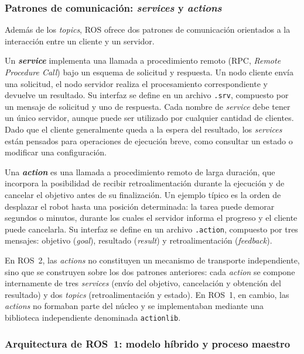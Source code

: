 \subsubsection{Patrones de comunicación: \textit{services} y \textit{actions}}

Además de los \textit{topics}, ROS ofrece dos patrones de comunicación
orientados a la interacción entre un cliente y un servidor.

Un \textbf{\textit{service}} implementa una llamada a procedimiento remoto
(RPC, \textit{Remote Procedure Call}) bajo un esquema de solicitud y
respuesta. Un nodo cliente envía una solicitud, el nodo servidor realiza el
procesamiento correspondiente y devuelve un resultado. Su interfaz se define en
un archivo \texttt{.srv}, compuesto por un mensaje de solicitud y uno de
respuesta. Cada nombre de \textit{service} debe tener un único servidor, aunque
puede ser utilizado por cualquier cantidad de clientes. Dado que el cliente
generalmente queda a la espera del resultado, los \textit{services} están
pensados para operaciones de ejecución breve, como consultar un estado o
modificar una configuración.

Una \textbf{\textit{action}} es una llamada a procedimiento remoto de larga
duración, que incorpora la posibilidad de recibir retroalimentación durante la
ejecución y de cancelar el objetivo antes de su finalización. Un ejemplo típico
es la orden de desplazar el robot hasta una posición determinada: la tarea
puede demorar segundos o minutos, durante los cuales el servidor informa el
progreso y el cliente puede cancelarla. Su interfaz se define en un archivo
\texttt{.action}, compuesto por tres mensajes: objetivo (\textit{goal}),
resultado (\textit{result}) y retroalimentación (\textit{feedback}).

En ROS~2, las \textit{actions} no constituyen un mecanismo de transporte
independiente, sino que se construyen sobre los dos patrones anteriores: cada
\textit{action} se compone internamente de tres \textit{services} (envío del
objetivo, cancelación y obtención del resultado) y dos \textit{topics}
(retroalimentación y estado). En ROS~1, en cambio, las \textit{actions} no
formaban parte del núcleo y se implementaban mediante una biblioteca
independiente denominada \texttt{actionlib}.

\subsubsection{Arquitectura de ROS~1: modelo híbrido y proceso maestro}

